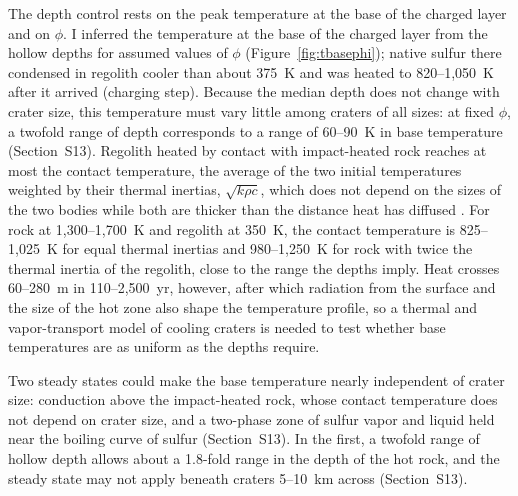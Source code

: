 \documentclass[article,review]{planetary}
\begin{document}
The depth control rests on the peak temperature at the base of the charged layer and on $\phi$. I inferred the temperature at the base of the charged layer from the hollow depths for assumed values of $\phi$ (Figure~\ref{fig:tbasephi}); native sulfur there condensed in regolith cooler than about 375~K and was heated to 820--1,050~K after it arrived (charging step). Because the median depth does not change with crater size, this temperature must vary little among craters of all sizes: at fixed $\phi$, a twofold range of depth corresponds to a range of 60--90~K in base temperature (Section~S13). Regolith heated by contact with impact-heated rock reaches at most the contact temperature, the average of the two initial temperatures weighted by their thermal inertias, $\sqrt{k \rho c}$, which does not depend on the sizes of the two bodies while both are thicker than the distance heat has diffused \parencite{carslaw1959}. For rock at 1,300--1,700~K and regolith at 350~K, the contact temperature is 825--1,025~K for equal thermal inertias and 980--1,250~K for rock with twice the thermal inertia of the regolith, close to the range the depths imply. Heat crosses 60--280~m in 110--2,500~yr, however, after which radiation from the surface and the size of the hot zone also shape the temperature profile, so a thermal and vapor-transport model of cooling craters is needed to test whether base temperatures are as uniform as the depths require.

Two steady states could make the base temperature nearly independent of crater size: conduction above the impact-heated rock, whose contact temperature does not depend on crater size, and a two-phase zone of sulfur vapor and liquid held near the boiling curve of sulfur (Section~S13). In the first, a twofold range of hollow depth allows about a 1.8-fold range in the depth of the hot rock, and the steady state may not apply beneath craters 5--10~km across (Section~S13).
\end{document}
